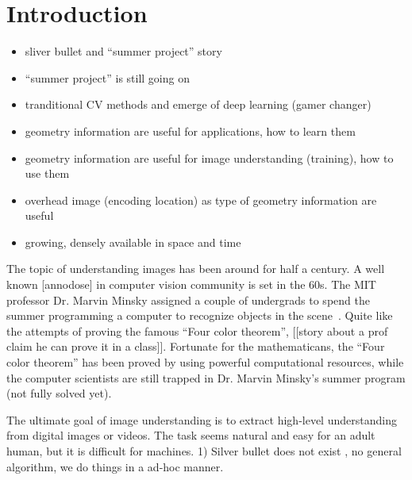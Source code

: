\chapter{Introduction}
\label{chap:intro}

\makeatletter
\newenvironment{chapquote}[2][2em]
{\setlength{\@tempdima}{#1} \def\chapquote@author{#2} \parshape 1
  \@tempdima \dimexpr\textwidth-2\@tempdima\relax \itshape}
{\par\normalfont\hfill--\
\chapquote@author\hspace*{\@tempdima}\par\bigskip}
\makeatother


\begin{itemize}
  \item sliver bullet and ``summer project'' story
  \item ``summer project'' is still going on
  \item tranditional CV methods and emerge of deep learning (gamer changer)
  \item geometry information are useful for applications, how to learn them
  \item geometry information are useful for image understanding (training), how to use them
  \item overhead image (encoding location) as type of geometry information are useful
  \item growing, densely available in space and time
\end{itemize}

The topic of understanding images has been around for half a century.
A well known [annodose] in computer vision community is set in the
60s. The MIT professor Dr. Marvin Minsky assigned a couple of
undergrads to spend the summer programming a computer to recognize
objects in the scene~\cite{boden2006mind}. Quite like the attempts of
proving the famous ``Four color theorem'', [[story about a prof claim
he can prove it in a class]]. Fortunate for the mathematicans, the
``Four color theorem'' has been proved by using powerful computational
resources, while the computer scientists are still trapped in Dr.
Marvin Minsky's summer program (not fully solved yet).

The ultimate goal of image understanding is to extract high-level
understanding from digital images or videos. The task seems natural
and easy for an adult human, but it is difficult for machines. 1) Silver
bullet does not exist \todo{cite}, no general algorithm, we do things
in a ad-hoc manner.

